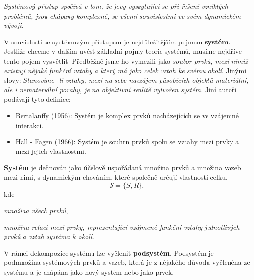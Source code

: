        \emph{Systémový přístup spočívá v tom, že jevy vyskytující se při řešení vzniklých problémů, 
       jsou chápany komplexně, se všemi souvislostmi ve svém dynamickém vývoji.}
       
       V souvislosti se systémovým přístupem je nejdůležitějším pojmem \textbf{systém}. Jestliže 
       chceme v dalším uvést základní pojmy teorie systémů, musíme nejdříve tento pojem vysvětlit. 
       Předběžně jsme ho vymezili jako \emph{soubor prvků, mezi nimiž existuji nějaké funkční 
       vztahy a který má jako celek vztah ke svému okolí}. Jinými slovy: \emph{Stanovíme- li 
       vztahy, mezi na sebe navzájem působících objektů materiální, ale i nemateriální povahy, je na
       objektivní realitě vytvořen systém.} Jiní autoři podávají tyto definice:
       \begin{itemize}[noitemsep]
         \item Bertalanffy (1956): Systém je komplex prvků nacházejících se ve vzájemné interakci.
         \item Hall - Fagen (1966): Systém je souhrn prvků spolu se vztahy mezi prvky a mezi jejich 
               vlastnostmi.
       \end{itemize}

       \begin{definition}
        \textbf{Systém} je definován jako účelově uspořádaná množina prvků a množina vazeb mezi 
        nimi, s dynamickým chováním, které společně určují vlastnosti celku.
        \begin{equation}
          \mathscr{S} = \{S,R \},
        \end{equation}
        kde
        \begin{description}[leftmargin=5em,style=nextline]
          \item[\hspace{2em}\(S \ldots\)] \emph{množina všech prvků},
          \item[\hspace{2em}\(R \ldots\)] \emph{množina relací mezi prvky, reprezentující vzájmené 
                                         funkční vztahy jednotlivých prvků a vztah systému k okolí.}
        \end{description}
       \end{definition}
       
       V rámci dekompozice systému lze vyčlenit \textbf{podsystém}. Podsystém je podmnožina
       systémových prvků a vazeb, která je z nějakého důvodu vyčleněna ze systému a je chápána
       jako nový systém nebo jako prvek.
       
